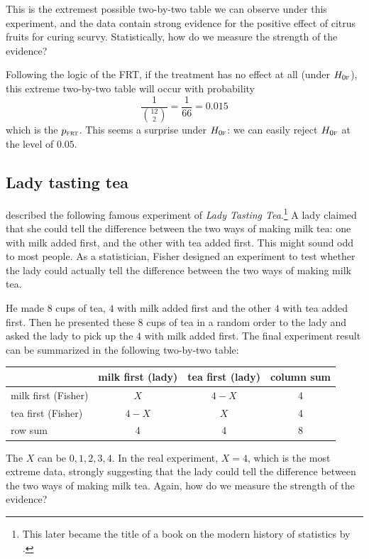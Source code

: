 This is the extremest possible two-by-two table we can observe under this experiment, and the data contain strong evidence for the positive effect of citrus fruits for curing scurvy. Statistically, how do we measure the strength of the evidence?


Following the logic of the FRT, if the treatment has no effect at all (under $H_{0\textsc{f}}$), this extreme two-by-two table will occur with probability 
$$
 \frac{1}{\binom{12}{2}} = \frac{1}{66} = 0.015
$$
which is the $p_{\textsc{frt}}$. 
This seems a surprise under $H_{0\textsc{f}}$: we can easily reject $H_{0\textsc{f}}$ at the level of $0.05.$



\subsection{Lady tasting tea}\label{section::lady-tasting-tea}


\citet{Fisher:1935} described the following famous experiment of {\it Lady Tasting Tea}.\footnote{This later became the title of a book on the modern history of statistics by \citet{salsburg2001lady}.}  A lady claimed that she could tell the difference between the two ways of making milk tea: one with milk added first, and the other with tea added first. This might sound odd to most people. As a statistician, Fisher designed an experiment to test whether the lady could actually tell the difference between the two ways of making milk tea. 

He made $8$ cups of tea, $4$ with milk added first and the other $4$ with tea added first. Then he presented these $8$ cups of tea in a random order to the lady and asked the lady to pick up the $4$ with milk added first. The final experiment result can be summarized in the following two-by-two table: 

\begin{tabular}{lccc}
\hline 
      &    milk first (lady)&    tea first (lady) & column sum \\ \hline
      milk first (Fisher) & $X$ & $4-X$ & 4\\ 
   tea first (Fisher) & $4-X$ & $X$ & 4\\
   row sum & 4 & 4 &8 \\
   \hline 
\end{tabular}

The $X$ can be $0, 1, 2, 3, 4$. In the real experiment, $X = 4$, which is the most extreme data, strongly suggesting that the lady could tell the difference between the two ways of making milk tea. Again, how do we measure the strength of the evidence?


